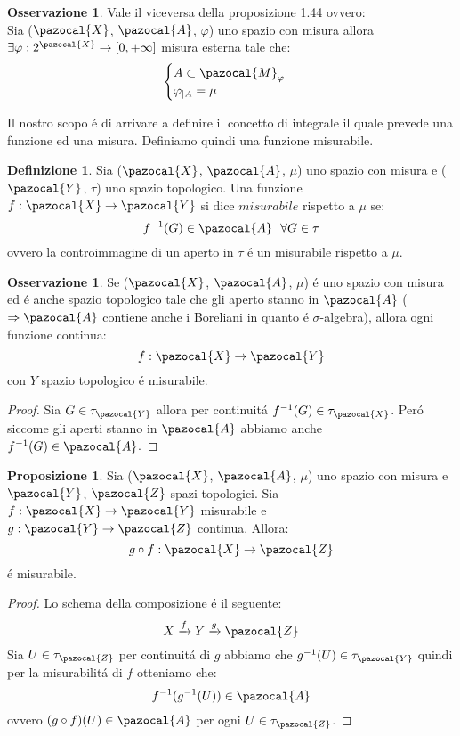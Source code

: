 \documentclass[11pt,a4paper]{report}
\theoremstyle{plain}
\theoremstyle{definition}
\newtheorem{defn}[thm]{Definizione} %
\newtheorem{prop}[thm]{Proposizione} %
\newtheorem{oss}[thm]{Osservazione} %
\newcommand{\M}{\pazocal{M}_\varphi}
\newcommand{\X}{\pazocal{X}}
\newcommand{\Y}{\pazocal{Y}}
\newcommand{\Z}{\pazocal{Z}}
\newcommand{\A}{\pazocal{A}}
\begin{document}
\begin{oss}
	Vale il viceversa della proposizione 1.44 ovvero:\\
	Sia ($\X$, $\A$, $\varphi$) uno spazio con misura allora $\exists \varphi : 2^\X \rightarrow [0,+\infty]$ misura esterna tale che:
	\[
		\begin{cases}
			A \subset \M \\
			\varphi_{|A} = \mu
		\end{cases}	
	\]
\end{oss}

Il nostro scopo \'e di arrivare a definire il concetto di integrale il quale prevede una funzione ed una misura. Definiamo quindi una funzione misurabile.

\begin{defn}
	Sia ($\X$, $\A$, $\mu$) uno spazio con misura e ($\pazocal{Y}$, $\tau$) uno spazio topologico. Una funzione $f : \X \rightarrow \Y$ si dice $misurabile$ rispetto a $\mu$ se:
	\[
		f^{-1}(G) \in \A\ \ \forall G \in \tau	
	\]
	ovvero la controimmagine di un aperto in $\tau$ \'e un misurabile rispetto a $\mu$.
\end{defn}

\begin{oss}
	Se ($\X$, $\A$, $\mu$) \'e uno spazio con misura ed \'e anche spazio topologico tale che gli aperto stanno in $\A$ ($\Rightarrow \A$ contiene anche i Boreliani in quanto \'e $\sigma$-algebra), allora ogni funzione continua:
	\[
		f : \X \rightarrow	\Y
	\]
	con $Y$ spazio topologico \'e misurabile.
\end{oss}
\begin{proof}
	Sia $G \in \tau_\Y$ allora per continuit\'a $f^{-1}(G) \in \tau_\X$. Per\'o siccome gli aperti stanno in $\A$ abbiamo anche $f^{-1}(G) \in \A$.
\end{proof}

\begin{prop}
	Sia ($\X$, $\A$, $\mu$) uno spazio con misura e $\Y$, $\Z$ spazi topologici. Sia $f : \X \rightarrow \Y$ misurabile e $g : \Y \rightarrow \Z$ continua. Allora:
	\[
		g\circ f : \X \rightarrow \Z	
	\]
	\'e misurabile.
\end{prop}
\begin{proof}
	Lo schema della composizione \'e il seguente:
	\[
		X \xrightarrow{f} Y \xrightarrow{g} \Z	
	\]
	Sia $U \in \tau_\Z$ per continuit\'a di $g$ abbiamo che $g^{-1}(U) \in \tau_\Y$ quindi per la misurabilit\'a di $f$ otteniamo che:
	\[
		f^{-1}(g^{-1}(U)) \in \A
	\]
	ovvero $(g \circ f)(U) \in \A$ per ogni $U \in \tau_\Z$.
\end{proof}
\end{document}
